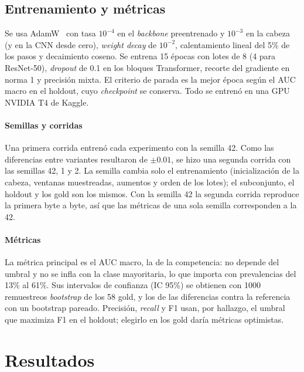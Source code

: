 \documentclass[conference]{IEEEtran}
\begin{document}
\subsection{Entrenamiento y métricas}
\label{sec:entrenamiento}

Se usa AdamW~\cite{loshchilov2019adamw} con tasa $10^{-4}$ en el \emph{backbone} preentrenado y $10^{-3}$ en la cabeza (y en la CNN desde cero), \emph{weight decay} de $10^{-2}$, calentamiento lineal del 5\% de los pasos y decaimiento coseno.
Se entrena 15 épocas con lotes de 8 (4 para ResNet-50), \emph{dropout} de 0.1 en los bloques Transformer, recorte del gradiente en norma 1 y precisión mixta.
El criterio de parada es la mejor época según el AUC macro en el holdout, cuyo \emph{checkpoint} se conserva.
Todo se entrenó en una GPU NVIDIA T4 de Kaggle.

\paragraph*{Semillas y corridas}
Una primera corrida entrenó cada experimento con la semilla 42.
Como las diferencias entre variantes resultaron de $\pm0.01$, se hizo una segunda corrida con las semillas 42, 1 y 2.
La semilla cambia solo el entrenamiento (inicialización de la cabeza, ventanas muestreadas, aumentos y orden de los lotes); el subconjunto, el holdout y los gold son los mismos.
Con la semilla 42 la segunda corrida reproduce la primera byte a byte, así que las métricas de una sola semilla corresponden a la 42.

\paragraph*{Métricas}
La métrica principal es el AUC macro, la de la competencia: no depende del umbral y no se infla con la clase mayoritaria, lo que importa con prevalencias del 13\% al 61\%.
Sus intervalos de confianza (IC 95\%) se obtienen con 1000 remuestreos \emph{bootstrap} de los 58 gold, y los de las diferencias contra la referencia con un bootstrap pareado.
Precisión, \emph{recall} y F1 usan, por hallazgo, el umbral que maximiza F1 en el holdout; elegirlo en los gold daría métricas optimistas.

\section{Resultados}
\label{sec:resultados}
\end{document}
